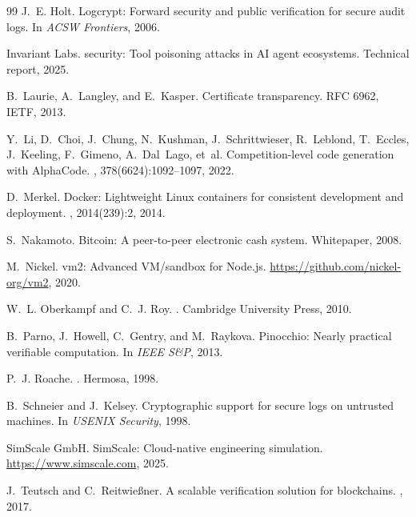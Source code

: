 \documentclass[letterpaper,twocolumn,10pt]{article}
\begin{document}
\begin{thebibliography}{99}
J.~E. Holt.
\newblock Logcrypt: Forward security and public verification for
  secure audit logs.
\newblock In {\em ACSW Frontiers}, 2006.

Invariant Labs.
 security: Tool poisoning attacks in AI agent
  ecosystems.
\newblock Technical report, 2025.

B.~Laurie, A.~Langley, and E.~Kasper.
\newblock Certificate transparency.
\newblock RFC 6962, IETF, 2013.

Y.~Li, D.~Choi, J.~Chung, N.~Kushman, J.~Schrittwieser,
R.~Leblond, T.~Eccles, J.~Keeling, F.~Gimeno, A.~Dal~Lago, et~al.
\newblock Competition-level code generation with AlphaCode.
, 378(6624):1092--1097, 2022.

D.~Merkel.
\newblock Docker: Lightweight {Linux} containers for consistent
  development and deployment.
, 2014(239):2, 2014.

S.~Nakamoto.
\newblock Bitcoin: A peer-to-peer electronic cash system.
\newblock Whitepaper, 2008.

M.~Nickel.
\newblock vm2: Advanced {VM/sandbox} for {Node.js}.
\newblock \url{https://github.com/nickel-org/vm2}, 2020.

W.~L. Oberkampf and C.~J. Roy.
.
\newblock Cambridge University Press, 2010.

B.~Parno, J.~Howell, C.~Gentry, and M.~Raykova.
\newblock Pinocchio: Nearly practical verifiable computation.
\newblock In {\em IEEE S\&P}, 2013.

P.~J. Roache.
.
\newblock Hermosa, 1998.

B.~Schneier and J.~Kelsey.
\newblock Cryptographic support for secure logs on untrusted
  machines.
\newblock In {\em USENIX Security}, 1998.

SimScale GmbH.
\newblock SimScale: Cloud-native engineering simulation.
\newblock \url{https://www.simscale.com}, 2025.

J.~Teutsch and C.~Reitwie{\ss}ner.
\newblock A scalable verification solution for blockchains.
, 2017.


\end{thebibliography}
\end{document}
